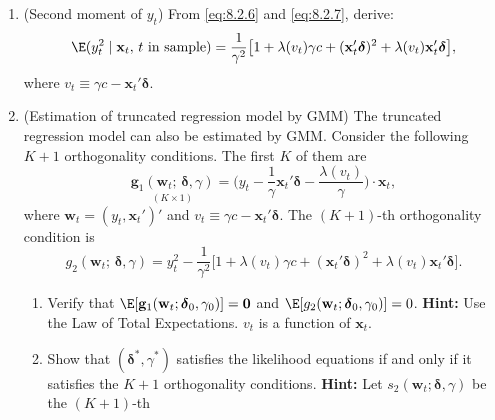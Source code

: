 \begin{enumerate}
\item (Second moment of $y_t$)\quad
  From \eqref{eq:8.2.6} and \eqref{eq:8.2.7}, derive:
  \[
    \E(y_t^2 \mid \mathbf{x}_t,\, t \text{ in sample})
    = \frac{1}{\gamma^2}\bigl[1 + \lambda(v_t)\gamma c
      + (\mathbf{x}_t'\boldsymbol{\delta})^2
      + \lambda(v_t)\mathbf{x}_t'\boldsymbol{\delta}\bigr],
  \]
  where $v_t \equiv \gamma c - \mathbf{x}_t'\boldsymbol{\delta}$.

\item (Estimation of truncated regression model by GMM)\quad
  The truncated regression model can also be estimated by GMM. Consider the following $K + 1$
  orthogonality conditions. The first $K$ of them are
  \begin{equation}
    \underset{(K \times 1)}{\mathbf{g}_1(\mathbf{w}_t;\, \boldsymbol{\delta}, \gamma)}
    = \biggl(y_t - \frac{1}{\gamma}\mathbf{x}_t'\boldsymbol{\delta}
      - \frac{\lambda(v_t)}{\gamma}\biggr) \cdot \mathbf{x}_t,
    \label{eq:8.2.19} \tag{8.2.19}
  \end{equation}
  where $\mathbf{w}_t = (y_t, \mathbf{x}_t')'$ and
  $v_t \equiv \gamma c - \mathbf{x}_t'\boldsymbol{\delta}$. The $(K+1)$-th orthogonality condition is
  \begin{equation}
    g_2(\mathbf{w}_t;\, \boldsymbol{\delta}, \gamma)
    = y_t^2 - \frac{1}{\gamma^2}\bigl[1 + \lambda(v_t)\gamma c
      + (\mathbf{x}_t'\boldsymbol{\delta})^2
      + \lambda(v_t)\mathbf{x}_t'\boldsymbol{\delta}\bigr].
    \label{eq:8.2.20} \tag{8.2.20}
  \end{equation}

  \begin{enumerate}[label=(\alph*)]
  \item Verify that
    $\E[\mathbf{g}_1(\mathbf{w}_t; \boldsymbol{\delta}_0, \gamma_0)] = \mathbf{0}$ and
    $\E[g_2(\mathbf{w}_t; \boldsymbol{\delta}_0, \gamma_0)] = 0$.
    \textbf{Hint:} Use the Law of Total Expectations. $v_t$ is a function of $\mathbf{x}_t$.

  \item Show that $(\boldsymbol{\delta}^*, \gamma^*)$ satisfies the likelihood equations if and only if it satisfies
    the $K+1$ orthogonality conditions. \textbf{Hint:} Let $s_2(\mathbf{w}_t; \boldsymbol{\delta}, \gamma)$ be the $(K+1)$-th
  \end{enumerate}
\end{enumerate}

